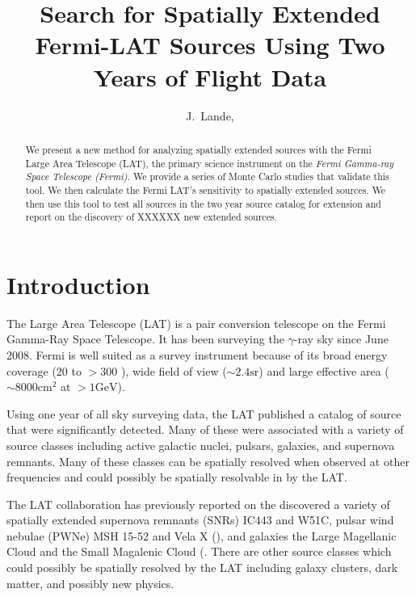 \documentclass[12pt,preprint]{aastex}
\newcommand{\mev}{\text{MeV}\xspace}
\newcommand{\gev}{\text{GeV}\xspace}
\newcommand{\sr}{\text{sr}\xspace}
\newcommand{\cm}{\text{cm}\xspace}
\begin{document}
\title{Search for Spatially Extended Fermi-LAT Sources Using Two Years of Flight
Data}

\author{
J.~Lande, 
}


\begin{abstract}
We present a new method for analyzing spatially extended sources with
the Fermi Large Area Telescope (LAT), the primary science instrument
on the {\em Fermi Gamma-ray Space Telescope (Fermi)}.  We provide a
series of Monte Carlo studies that validate this tool.
We then calculate the Fermi LAT's sensitivity to spatially extended
sources.  We then use this tool to test all sources in the two
year source catalog for extension and report on the discovery
of XXXXXX new extended sources.
\end{abstract}

\section{Introduction}


The Large Area Telescope (LAT) is a pair conversion telescope on the
Fermi Gamma-Ray Space Telescope. It has been surveying the $\gamma$-ray
sky since June 2008.  Fermi is well suited as a survey
instrument because of its broad energy coverage (20 \mev
to $>300$ \gev), wide field of view ($\sim 2.4 \sr$) and large effective
area ($\sim 8000 \cm^2$ at $>1 \gev$).

Using one year of all sky surveying data, the LAT published a catalog of
source that were significantly detected.  Many of these were associated
with a variety of source classes including active galactic nuclei,
pulsars, galaxies, and supernova remnants.  Many of these classes can be
spatially resolved when observed at other frequencies and could possibly
be spatially resolvable in \gev by the LAT.

The LAT collaboration has previously reported on the discovered
a variety of spatially extended supernova remnants (SNRs)
IC443 and W51C, pulsar wind nebulae (PWNe) MSH 15-52 and Vela X
(\cite{ic443,w51c,msh1552,velax}), and galaxies the Large Magellanic
Cloud and the Small Magalenic Cloud (\cite{lmc,smc}.  There are other
source classes which could possibly be spatially resolved by the LAT
including galaxy clusters, dark matter, and possibly new physics.
\end{document}
